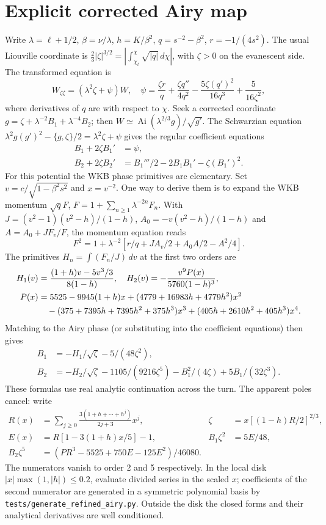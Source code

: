 \documentclass[10pt]{article}
\newcommand{\Ai}{\operatorname{Ai}}
\begin{document}
\section{Explicit corrected Airy map}
Write $\lambda=\ell+1/2$, $\beta=\nu/\lambda$, $h=K/\beta^2$,
$q=s^{-2}-\beta^2$, $r=-1/(4s^2)$. The usual Liouville coordinate is
$\frac23|\zeta|^{3/2}=|\int_{\chi_t}^{\chi}\sqrt{|q|}\,d\chi|$,
with $\zeta>0$ on the evanescent side. The transformed equation is
\begin{equation}
 W_{\zeta\zeta}=(\lambda^2\zeta+\psi)W,\quad
 \psi=\frac{\zeta r}{q}+\frac{\zeta q''}{4q^2}
 -\frac{5\zeta(q')^2}{16q^3}+\frac{5}{16\zeta^2},
\end{equation}
where derivatives of $q$ are with respect to $\chi$.
Seek a corrected coordinate $g=\zeta+\lambda^{-2}B_1+\lambda^{-4}B_2$;
then $W\simeq\Ai(\lambda^{2/3}g)/\sqrt{g'}$.
The Schwarzian equation $\lambda^2g(g')^2-\{g,\zeta\}/2=\lambda^2\zeta+\psi$
gives the regular coefficient equations
\begin{align}
 B_1+2\zeta B_1'&=\psi,\\
 B_2+2\zeta B_2'&=B_1'''/2-2B_1B_1'-\zeta(B_1')^2.
\end{align}
For this potential the WKB phase primitives are elementary. Set
$v=c/\sqrt{1-\beta^2s^2}$ and $x=v^{-2}$. One way to derive them is to
expand the WKB momentum $\sqrt q F$, $F=1+\sum_{n\geq1}\lambda^{-2n}F_n$.
With $J=(v^2-1)(v^2-h)/(1-h)$, $A_0=-v(v^2-h)/(1-h)$ and
$A=A_0+J F_v/F$, the momentum equation reads
\[
 F^2=1+\lambda^{-2}[r/q+JA_v/2+A_0A/2-A^2/4].
\]
The primitives $H_n=\int(F_n/J)\,dv$ at the first two orders are
\begin{align}
 H_1(v)&=\frac{(1+h)v-5v^3/3}{8(1-h)},\quad
 H_2(v)=-\frac{v^9P(x)}{5760(1-h)^3},\\
 P(x)&=5525-9945(1+h)x+(4779+16983h+4779h^2)x^2\notag\\
 &\quad-(375+7395h+7395h^2+375h^3)x^3
 +(405h+2610h^2+405h^3)x^4 .
\end{align}
Matching to the Airy phase (or substituting into the coefficient equations)
then gives
\begin{align}
 B_1&=-H_1/\sqrt\zeta-5/(48\zeta^2),\\
 B_2&=-H_2/\sqrt\zeta-1105/(9216\zeta^5)
       -B_1^2/(4\zeta)+5B_1/(32\zeta^3).
\end{align}
These formulas use real analytic continuation across the turn. The apparent
poles cancel: write
\begin{align}
 R(x)&=\sum_{j\geq0}\frac{3(1+h+\cdots+h^j)}{2j+3}x^j,
 &\zeta&=x[(1-h)R/2]^{2/3},\\
 E(x)&=R[1-3(1+h)x/5]-1,
 &B_1\zeta^2&=5E/48,\\
 B_2\zeta^5&=(P R^3-5525+750E-125E^2)/46080 .
\end{align}
The numerators vanish to order 2 and 5 respectively. In the local disk
$|x|\max(1,|h|)\leq0.2$, evaluate divided series in the scaled $x$;
coefficients of the second numerator are generated in a symmetric polynomial
basis by \texttt{tests/generate\_refined\_airy.py}. Outside the disk the
closed forms and their analytical derivatives are well conditioned.
\end{document}
